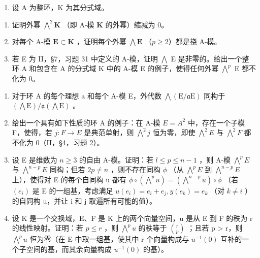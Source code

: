 \BourbakiExercisesSection

\begin{enumerate}
\def\labelenumi{\arabic{enumi}.}
\tightlist
\item
  设 A 为整环，K 为其分式域。
\end{enumerate}

\begin{enumerate}
\def\labelenumi{(\alph{enumi})}
\item
  证明外幂 \(\bigwedge^{2}\mathbf{K}\) （即 A-模 \(\mathbf{K}\) 的外幂）缩减为 0。
\item
  对每个 A-模 \(\mathbf{E} \subset \mathbf{K}\) ，证明每个外幂 \(\bigwedge \mathbf{E}\) （\(p \geqslant 2\)）都是挠 A-模。
\item
  若 E 为 II，§7，习题 31 中定义的 A-模，证明 \(\bigwedge\) E 是非零的。给出一个整环 A 和包含在 A 的分式域 K 中的 A-模 E 的例子，使得任何外幂 \(\bigwedge^{p}\) E 都不化为 0。
\end{enumerate}

\begin{enumerate}
\def\labelenumi{\arabic{enumi}.}
\setcounter{enumi}{1}
\item
  对于环 A 的每个理想 a 和每个 A-模 E，外代数 \(\bigwedge(\mathrm{E}/\mathfrak{a}\mathrm{E})\) 同构于 \((\bigwedge\mathrm{E})/\mathfrak{a}(\bigwedge\mathrm{E})\) 。
\item
  给出一个具有如下性质的环 A 的例子：在 A-模 \(E = A^{2}\) 中，存在一个子模 F，使得，若 \(j: F \to E\) 是典范单射，则 \(\bigwedge^{2} j\) 恒为零，即使 \(\bigwedge^{2} E\) 与 \(\bigwedge^{2} F\) 都不化为 0（II，§4，习题 2）。
\item
  设 E 是维数为 \(n \geqslant 3\) 的自由 A-模。证明：若 \(l \leqslant p \leqslant n - 1\) ，则 A-模 \(\bigwedge^{p}E\) 与 \(\bigwedge^{n-p}E\) 同构；但若 \(2p \neq n\) ，则不存在同构 \(\phi\) （从 \(\bigwedge^{p}E\) 到 \(\bigwedge^{n-p}E\) 上），使得对 E 的每个自同构 u 都有 \(\phi \circ \left(\bigwedge^{p}u\right) = \left(\bigwedge^{n-p}u\right) \circ \phi\) （若 \((e_{i})\) 是 E 的一组基，考虑满足 \(u(e_{i}) = e_{i} + e_{j}, y(e_{k}) = e_{k}\) （对 \(k \neq i\) ）的自同构 u，并让 i 和 j 取遍所有可能的值）。
\item
  设 K 是一个交换域，E、F 是 K 上的两个向量空间，u 是从 E 到 F 的秩为 r 的线性映射。证明：若 \(p \leqslant r\) ，则 \(\bigwedge^{p}u\) 的秩等于 \(\binom{r}{p}\) ；且若 p \textgreater{} r，则 \(\bigwedge^{p}u\) 恒为零（在 E 中取一组基，使其中 r 个向量构成与 \(u^{-1}(0)\) 互补的一个子空间的基，而其余向量构成 \(u^{-1}(0)\) 的基）。
\end{enumerate}

